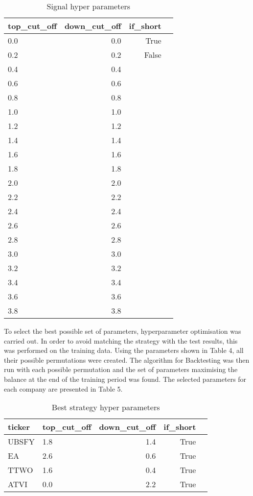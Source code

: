 \documentclass[11pt]{article} %
\begin{document}
\begin{table}[H]
\centering
\caption{Signal hyper parameters}
\begin{tabular}{lrrl}
\toprule
  top\_cut\_off &  down\_cut\_off & if\_short \\
\midrule
        0.0 &           0.0 &     True \\
         0.2 &           0.2 &    False \\
         0.4 &           0.4  \\
         0.6 &           0.6  \\
          0.8 &           0.8  \\
          1.0 &           1.0  \\
          1.2 &           1.2  \\
          1.4 &           1.4  \\
          1.6 &           1.6  \\
          1.8 &           1.8  \\
         2.0 &           2.0  \\
          2.2 &           2.2  \\
          2.4 &           2.4  \\
          2.6 &           2.6  \\
          2.8 &           2.8  \\
          3.0 &           3.0  \\
          3.2 &           3.2  \\
          3.4 &           3.4  \\
          3.6 &           3.6  \\
          3.8 &           3.8  \\
\bottomrule
\end{tabular}
\end{table}

To select the best possible set of parameters, hyperparameter optimisation was carried out. In order to avoid matching the strategy with the test results, this was performed on the training data. Using the parameters shown in Table 4, all their possible permutations were created. The algorithm for Backtesting was then run with each possible permutation and the set of parameters maximising the balance at the end of the training period was found. The selected parameters for each company are presented in Table 5. 

\begin{table}[H]
\centering
\caption{Best strategy hyper parameters}
\begin{tabular}{llrrl}
\toprule
 ticker &  top\_cut\_off &  down\_cut\_off &  if\_short \\
\midrule
  UBSFY &          1.8 &           1.4 &      True \\
     EA &          2.6 &           0.6 &      True \\
   TTWO &          1.6 &           0.4 &      True \\
   ATVI &          0.0 &           2.2 &      True \\
\bottomrule
\end{tabular}
\end{table}
\end{document}
